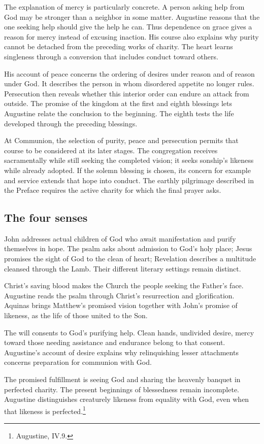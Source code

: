 The explanation of mercy is particularly concrete. A person asking help from God may be stronger than a neighbor in some matter. Augustine reasons that the one seeking help should give the help he can. Thus dependence on grace gives a reason for mercy instead of excusing inaction. His course also explains why purity cannot be detached from the preceding works of charity. The heart learns singleness through a conversion that includes conduct toward others.

His account of peace concerns the ordering of desires under reason and of reason under God. It describes the person in whom disordered appetite no longer rules. Persecution then reveals whether this interior order can endure an attack from outside. The promise of the kingdom at the first and eighth blessings lets Augustine relate the conclusion to the beginning. The eighth tests the life developed through the preceding blessings.

At Communion, the selection of purity, peace and persecution permits that course to be considered at its later stages. The congregation receives sacramentally while still seeking the completed vision; it seeks sonship's likeness while already adopted. If the solemn blessing is chosen, its concern for example and service extends that hope into conduct. The earthly pilgrimage described in the Preface requires the active charity for which the final prayer asks.

\subsection{The four senses}
\begin{fourSenses}
\item[Literal.] John addresses actual children of God who await manifestation and purify themselves in hope. The psalm asks about admission to God's holy place; Jesus promises the sight of God to the clean of heart; Revelation describes a multitude cleansed through the Lamb. Their different literary settings remain distinct.
\item[Allegorical.] Christ's saving blood makes the Church the people seeking the Father's face. Augustine reads the psalm through Christ's resurrection and glorification. Aquinas brings Matthew's promised vision together with John's promise of likeness, as the life of those united to the Son.
\item[Moral.] The will consents to God's purifying help. Clean hands, undivided desire, mercy toward those needing assistance and endurance belong to that consent. Augustine's account of desire explains why relinquishing lesser attachments concerns preparation for communion with God.
\item[Anagogical.] The promised fulfillment is seeing God and sharing the heavenly banquet in perfected charity. The present beginnings of blessedness remain incomplete. Augustine distinguishes creaturely likeness from equality with God, even when that likeness is perfected.\footnote{Augustine,  IV.9.}
\end{fourSenses}
